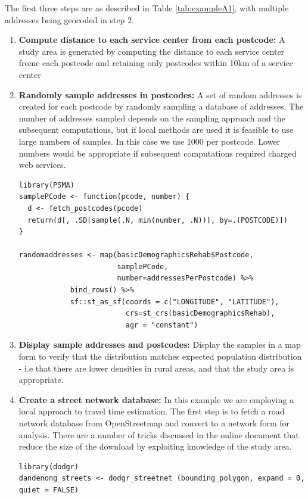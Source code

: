 \documentclass[utf8]{frontiersHLTH}
\begin{document}
\clearpage

\begin{table}[h]
\begin{center}
  \sffamily
  \tiny
\begin{mdframed}[backgroundcolor=blue!20]
The first three steps are as described in Table \ref{tab:exampleA1},
with multiple addresses being geocoded in step 2.
\begin{enumerate}
  \def\labelenumi{\arabic{enumi}.}
  \setcounter{enumi}{3}
\item
  {\bf Compute distance to each service center from each postcode:} A study
  area is generated by computing the distance to each service center
  frome each postcode and retaining only postcodes within 10km of a
  service center
\item
 {\bf Randomly sample addresses in postcodes:} A set of random addresses is created for each
  postcode by randomly sampling a database of addresses. The number of
  addresses sampled depends on the sampling approach and the subsequent
  computations, but if local methods are used it is feasible to use
  large numbers of samples. In this case we use 1000 per postcode. Lower
  numbers would be appropriate if subsequent computations required
  charged web services.

\begin{lstlisting}
library(PSMA)
samplePCode <- function(pcode, number) {
  d <- fetch_postcodes(pcode)
  return(d[, .SD[sample(.N, min(number, .N))], by=.(POSTCODE)])
}

randomaddresses <- map(basicDemographicsRehab$Postcode,
                       samplePCode,
                       number=addressesPerPostcode) %>%
            bind_rows() %>%
            sf::st_as_sf(coords = c("LONGITUDE", "LATITUDE"),
                         crs=st_crs(basicDemographicsRehab),
                         agr = "constant")
\end{lstlisting}

\item
  {\bf Display sample addresses and postcodes:} Display the samples in a map
  form to verify that the distribution matches expected population
  distribution - i.e that there are lower densities in rural areas, and
  that the study area is appropriate.
\item
  {\bf Create a street network database:} In this example we are employing a
  local approach to travel time estimation. The first step is to fetch a
  road network database from OpenStreetmap and convert to a network form
  for analysis. There are a number of tricks discussed in the online
  document that reduce the size of the download by exploiting knowledge
  of the study area.
\begin{lstlisting}
library(dodgr)
dandenong_streets <- dodgr_streetnet (bounding_polygon, expand = 0, quiet = FALSE)
\end{lstlisting}


\end{enumerate}
\end{mdframed}
\end{center}
\end{table}
\end{document}
